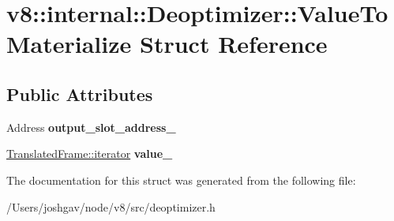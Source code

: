 \hypertarget{structv8_1_1internal_1_1_deoptimizer_1_1_value_to_materialize}{}\section{v8\+:\+:internal\+:\+:Deoptimizer\+:\+:Value\+To\+Materialize Struct Reference}
\label{structv8_1_1internal_1_1_deoptimizer_1_1_value_to_materialize}
\subsection*{Public Attributes}
\begin{DoxyCompactItemize}
\item 
Address {\bfseries output\+\_\+slot\+\_\+address\+\_\+}\hypertarget{structv8_1_1internal_1_1_deoptimizer_1_1_value_to_materialize_a84861bfa46e93a6f859136c6186c215e}{}\label{structv8_1_1internal_1_1_deoptimizer_1_1_value_to_materialize_a84861bfa46e93a6f859136c6186c215e}

\item 
\hyperlink{classv8_1_1internal_1_1_translated_frame_1_1iterator}{Translated\+Frame\+::iterator} {\bfseries value\+\_\+}\hypertarget{structv8_1_1internal_1_1_deoptimizer_1_1_value_to_materialize_a9cb3d7f6329987ded3f507c185f92706}{}\label{structv8_1_1internal_1_1_deoptimizer_1_1_value_to_materialize_a9cb3d7f6329987ded3f507c185f92706}

\end{DoxyCompactItemize}


The documentation for this struct was generated from the following file\+:\begin{DoxyCompactItemize}
\item 
/\+Users/joshgav/node/v8/src/deoptimizer.\+h\end{DoxyCompactItemize}
